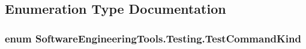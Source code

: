 \subsection{Enumeration Type Documentation}
\hypertarget{namespace_software_engineering_tools_1_1_testing_aa56e9d89003821b285e6eac88565f13a}{
\subsubsection[{Test\+Command\+Kind}]{\setlength{\rightskip}{0pt plus 5cm}enum {\bf Software\+Engineering\+Tools.\+Testing.\+Test\+Command\+Kind}}}\label{namespace_software_engineering_tools_1_1_testing_aa56e9d89003821b285e6eac88565f13a}
